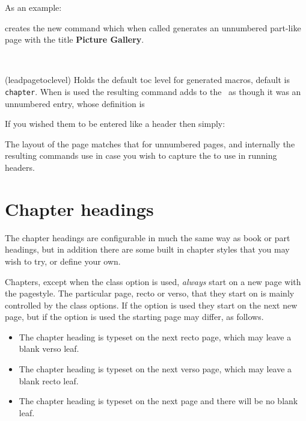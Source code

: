 As an example:
\begin{lcode}
\end{lcode}
creates the new command  which when called generates an unnumbered
part-like page with the title \textbf{Picture Gallery}.

\begin{syntax}
\cmd{\leadpagetoclevel} \\
\end{syntax}
\glossary(leadpagetoclevel)%
{}%
{Holds the default toc level for  generated macros,
default is \texttt{chapter}.}
When  is used the resulting command adds 
to the \toc\ as though it was an unnumbered \cmd{\leadpagetoclevel} entry,
whose definition is
\begin{lcode}
\newcommand*{\leadpagetoclevel}{chapter}
\end{lcode}
If you wished them to be entered like a \cmd{\part} header then simply:
\begin{lcode}
\renewcommand*{\leadpagetoclevel}{part}
\end{lcode}


    The layout of the page matches that for unnumbered \cmd{\part} pages, and
internally the resulting commands use \cmd{\partmark} in case you
wish to capture the  to use in running headers.



\section{Chapter headings}
\label{sec:chapter-headings}

    The chapter headings are configurable in much the same way as book or part
headings, but in addition there are some built in chapter styles that you may
wish to try, or define your own.

    Chapters, except when the  class option is used,
 \emph{always} start on a new page with the 
pagestyle. The particular page, recto or verso, that they start on is
mainly controlled by the class options. If the  option is used
they start on the next new page, but if the  option is
used the starting page may differ, as follows.
\begin{itemize}
\item[\Lopt{openright}] The chapter heading is typeset on the next recto page,
  which may leave a blank verso leaf.
\item[\Lopt{openleft}] The chapter heading is typeset on the next verso page,
  which may leave a blank recto leaf.
\item[\Lopt{openany}] The chapter heading is typeset on the next page and there
  will be no blank leaf.
\end{itemize}


